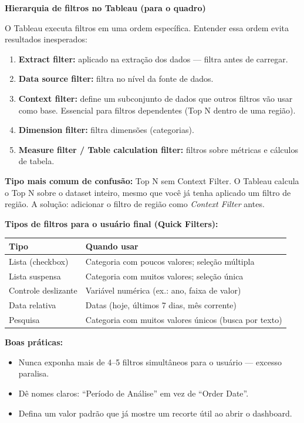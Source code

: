 \begin{BoardBox}
\textbf{Hierarquia de filtros no Tableau (para o quadro)}

O Tableau executa filtros em uma ordem específica. Entender essa ordem
evita resultados inesperados:

\begin{enumerate}
  \item \textbf{Extract filter:} aplicado na extração dos dados — filtra antes de carregar.
  \item \textbf{Data source filter:} filtra no nível da fonte de dados.
  \item \textbf{Context filter:} define um subconjunto de dados que outros filtros
  vão usar como base. Essencial para filtros dependentes (Top N dentro de uma região).
  \item \textbf{Dimension filter:} filtra dimensões (categorias).
  \item \textbf{Measure filter / Table calculation filter:} filtros sobre métricas
  e cálculos de tabela.
\end{enumerate}

\textbf{Tipo mais comum de confusão:} Top N sem Context Filter.
O Tableau calcula o Top N sobre o dataset inteiro, mesmo que você já tenha
aplicado um filtro de região. A solução: adicionar o filtro de região como
\emph{Context Filter} antes.
\end{BoardBox}

\begin{SolvedBox}
\textbf{Tipos de filtros para o usuário final (Quick Filters):}

\begin{tabular}{|l|p{9cm}|}
\hline
\textbf{Tipo} & \textbf{Quando usar} \\
\hline
Lista (checkbox) & Categoria com poucos valores; seleção múltipla \\
Lista suspensa & Categoria com muitos valores; seleção única \\
Controle deslizante & Variável numérica (ex.: ano, faixa de valor) \\
Data relativa & Datas (hoje, últimos 7 dias, mês corrente) \\
Pesquisa & Categoria com muitos valores únicos (busca por texto) \\
\hline
\end{tabular}

\textbf{Boas práticas:}
\begin{itemize}
  \item Nunca exponha mais de 4–5 filtros simultâneos para o usuário — excesso paralisa.
  \item Dê nomes claros: ``Período de Análise'' em vez de ``Order Date''.
  \item Defina um valor padrão que já mostre um recorte útil ao abrir o dashboard.
\end{itemize}
\end{SolvedBox}

